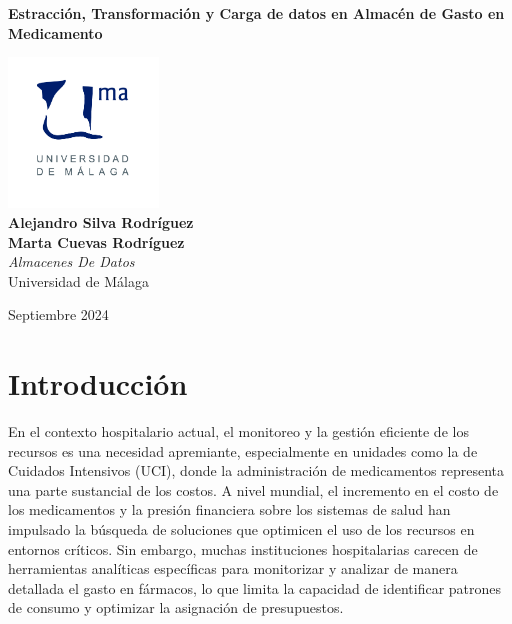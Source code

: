 \documentclass{article}
\begin{document}
\begin{titlepage}
	\centering
	\vspace*{3cm}
	
	{\Huge \textbf{Estracción, Transformación y Carga de datos en Almacén de Gasto en Medicamento}\\[0.5cm]}
	
	\vspace{2cm}
	\includegraphics[width=0.3\textwidth]{images/uma_logo.jpg}\\[1cm]
	
	{\LARGE \textbf{Alejandro Silva Rodríguez}\\[0.5cm]}
	{\LARGE \textbf{Marta Cuevas Rodríguez}\\[0.5cm]}
	{\large \textit{Almacenes De Datos}\\
		Universidad de Málaga\\
		}
	
	\vfill
	
	{\large Septiembre 2024}
\end{titlepage}

\tableofcontents

\newpage
\section{Introducción}
\label{sec:introduccion}

En el contexto hospitalario actual, el monitoreo y la gestión eficiente de los recursos es una necesidad apremiante, especialmente en unidades como la de Cuidados Intensivos (UCI), donde la administración de medicamentos representa una parte sustancial de los costos. A nivel mundial, el incremento en el costo de los medicamentos y la presión financiera sobre los sistemas de salud han impulsado la búsqueda de soluciones que optimicen el uso de los recursos en entornos críticos. Sin embargo, muchas instituciones hospitalarias carecen de herramientas analíticas específicas para monitorizar y analizar de manera detallada el gasto en fármacos, lo que limita la capacidad de identificar patrones de consumo y optimizar la asignación de presupuestos.\\
\end{document}
